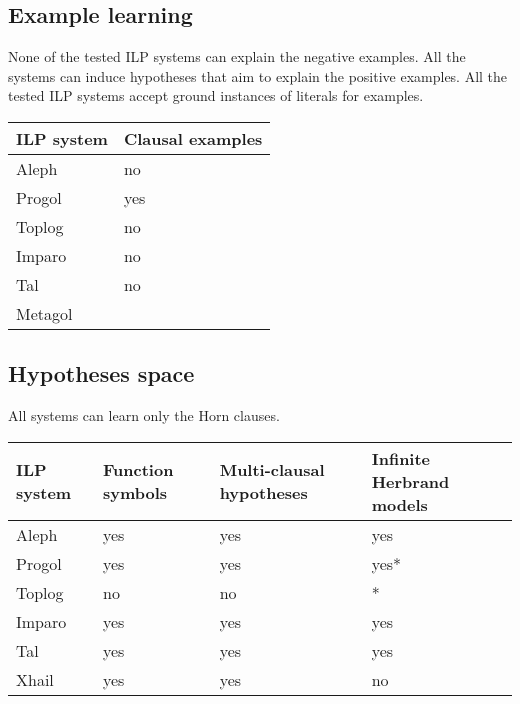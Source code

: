 \subsection{Example learning}
None of the tested ILP systems can explain the negative examples. All the systems can induce hypotheses that aim to explain the positive examples. All the tested ILP systems accept ground instances of literals for examples.
\begin{center}
    \begin{tabular}{ | l | p{5cm} |}
    \hline
    ILP system &  Clausal examples \\ \hline
    Aleph & no\\ \hline
    Progol & yes\\ \hline
    Toplog & no\\ \hline
    Imparo & no\\ \hline
    Tal & no\\ \hline
    Metagol & \\ \hline
    \hline
    \end{tabular}
\end{center}

\subsection{Hypotheses space}
All systems can learn only the Horn clauses.
\begin{center}
    \begin{tabular}{ | l | l | l | p{5cm} |}
    \hline
    ILP system & Function symbols & Multi-clausal hypotheses & Infinite Herbrand models\\ \hline
    Aleph & yes & yes & yes\\ \hline
    Progol & yes & yes & yes*\\ \hline
    Toplog & no & no & *\\ \hline
    Imparo & yes & yes & yes\\ \hline
    Tal & yes & yes & yes\\ \hline
    Xhail & yes & yes & no\\ \hline
    \hline
    \end{tabular}
\end{center}


